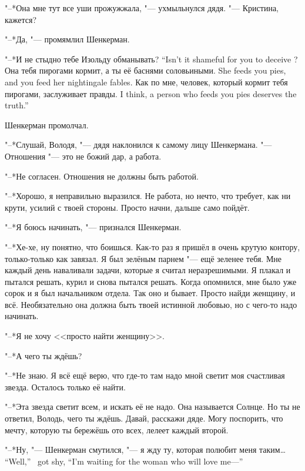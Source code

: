 \asterism

"--*Она мне тут все уши прожужжала, "--- ухмыльнулся дядя.
"--- Кристина, кажется?

"--*Да, "--- промямлил Шенкерман.

{"--*И не стыдно тебе Изольду обманывать?}
{``Isn't it shameful for you to deceive \Izolda?}
{Она тебя пирогами кормит, а ты её баснями соловьиными.}
{She feeds you pies, and you feed her nightingale fables.}
{Как по мне, человек, который кормит тебя пирогами, заслуживает правды.}
{I think, a person who feeds you pies deserves the truth.''}

Шенкерман промолчал.

"--*Слушай, Володя, "--- дядя наклонился к самому лицу Шенкермана.
"--- Отношения "--- это не божий дар, а работа.

"--*Не согласен.
Отношения не должны быть работой.

"--*Хорошо, я неправильно выразился.
Не работа, но нечто, что требует, как ни крути, усилий с твоей стороны.
Просто начни, дальше само пойдёт.

"--*Я боюсь начинать, "--- признался Шенкерман.

"--*Хе-хе, ну понятно, что боишься.
Как-то раз я пришёл в очень крутую контору, только-только как завязал.
Я был зелёным парнем "--- ещё зеленее тебя.
Мне каждый день наваливали задачи, которые я считал неразрешимыми.
Я плакал и пытался решать, курил и снова пытался решать.
Когда опомнился, мне было уже сорок и я был начальником отдела.
Так оно и бывает.
Просто найди женщину, и всё.
Необязательно она должна быть твоей истинной любовью, но с чего-то надо начинать.

"--*Я не хочу <<просто найти женщину>>.

"--*А чего ты ждёшь?

"--*Не знаю.
Я всё ещё верю, что где-то там надо мной светит моя счастливая звезда.
Осталось только её найти.

"--*Эта звезда светит всем, и искать её не надо.
Она называется Солнце.
Но ты не ответил, Володь, чего ты ждёшь.
Давай, расскажи дяде.
Могу поспорить, что мечту, которую ты бережёшь ото всех, лелеет каждый второй.

{"--*Ну, "--- Шенкерман смутился, "--- я жду ту, которая полюбит меня таким\ldots{}}
{``Well,'' \Shenkerman\ got shy, ``I'm waiting for the woman who will love me---''}

